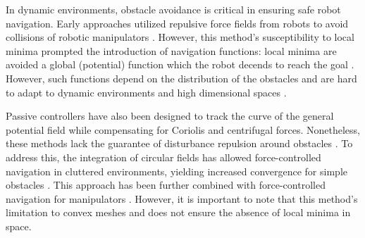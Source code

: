 In dynamic environments, obstacle avoidance is critical in ensuring safe robot navigation. Early approaches utilized repulsive force fields from robots to avoid collisions of robotic manipulators \cite{khatib1987unified}. 
However, this method's susceptibility to local minima prompted the introduction of navigation functions: local minima are avoided a global (potential) function which the robot decends to reach the goal \cite{koditschek1990robot}. However, such functions depend on the distribution of the obstacles and are hard to adapt to dynamic environments and high dimensional spaces \cite{loizou2022mobile}.

Passive controllers have also been designed to track the curve of the general potential field while compensating for Coriolis and centrifugal forces. Nonetheless, these methods lack the guarantee of disturbance repulsion around obstacles \cite{duindam2004passive}. To address this, the integration of circular fields \cite{singh1996real} has allowed force-controlled navigation in cluttered environments, yielding increased convergence for simple obstacles \cite{haddadin2011dynamic}. This approach has been further combined with force-controlled navigation for manipulators \cite{tulbure2020closing}. 
However, it is important to note that this method's limitation to convex meshes and does not ensure the absence of local minima in space.


